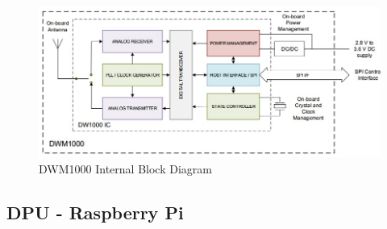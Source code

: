 \medskip
\begin{figure}[H]
\centering
    \includegraphics[scale=0.7]{./images/dwm1000_bd.jpg}
    \caption{DWM1000 Internal Block Diagram}
    \label{dwm1000_bd}
\end{figure}






\pagebreak
\subsection{DPU - Raspberry Pi}








